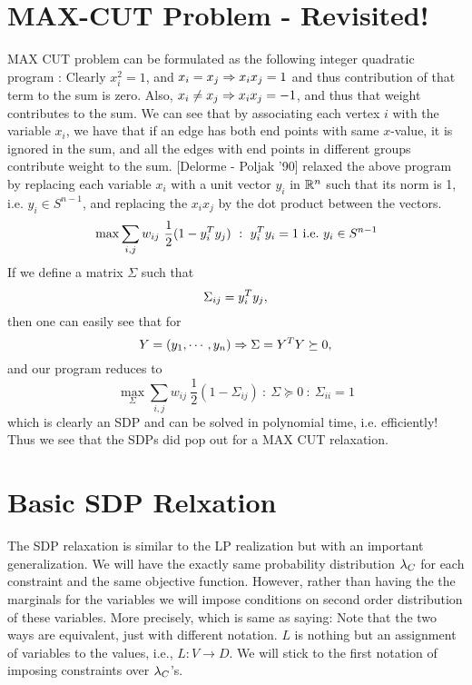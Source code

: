 \documentclass[12pt]{article}
\begin{document}
\section{MAX-CUT Problem - Revisited!}

MAX CUT problem can be formulated as the following integer quadratic program : 
Clearly $x_i^2=1$, and $x_i=x_j\Rightarrow x_ix_j=1$ and thus contribution of that term to the sum is zero. 
Also, $x_i \neq x_j \Rightarrow x_ix_j=-1$, and thus that weight contributes to the sum. 
We can see that by associating each vertex $i$ with the variable $x_i$, we have that if an edge has both end points with same $x$-value, it is ignored in the sum, and all the edges with end points in different groups contribute weight to the sum. 
[Delorme - Poljak '90] relaxed the above program by replacing each variable $x_i$ with a unit vector $y_i$ in $\mathbb{R}^n$ such that its norm is 1, i.e. $y_i \in S^{n-1}$, and replacing the $x_ix_j$ by the dot product between the vectors. 
\[ \max \sum_{i,j} w_{ij} \ \frac{1}{2}(1-y_i^T y_j) ~:~ y_i^T y_i = 1 {\mbox {\ i.e.\ }} y_i \in S^{n-1} \]
If we define a matrix $\Sigma$ such that $$\Sigma_{ij} = y_i^T y_j,$$ then one can easily see that for $$Y = (y_1, \cdots, y_n) \Rightarrow \Sigma = Y^T Y \succeq 0,$$ and our program reduces to 
\[ \max_\Sigma \sum_{i,j} w_{ij} \ \frac{1}{2}(1-\Sigma_{ij}) ~:~ \Sigma \succeq 0 ~:~ \Sigma_{ii} = 1  \]
which is clearly an SDP and can be solved in polynomial time, i.e. efficiently! 
Thus we see that the SDPs did pop out for a MAX CUT relaxation.

\section{Basic SDP Relxation}

The SDP relaxation is similar to the LP realization but with an important generalization. 
We will have the exactly same probability distribution $\lambda_C$ for each constraint and the same objective function. 
However, rather than having the the marginals for the variables we will impose conditions on second order distribution of these variables. 
More precisely,
which is same as saying: 
Note that the two ways are equivalent, just with different notation. 
$L$ is nothing but an assignment of variables to the values, i.e., $L : V \rightarrow D$. 
We will stick to the first notation of imposing constraints over $\lambda_C$'s. 
\end{document}
